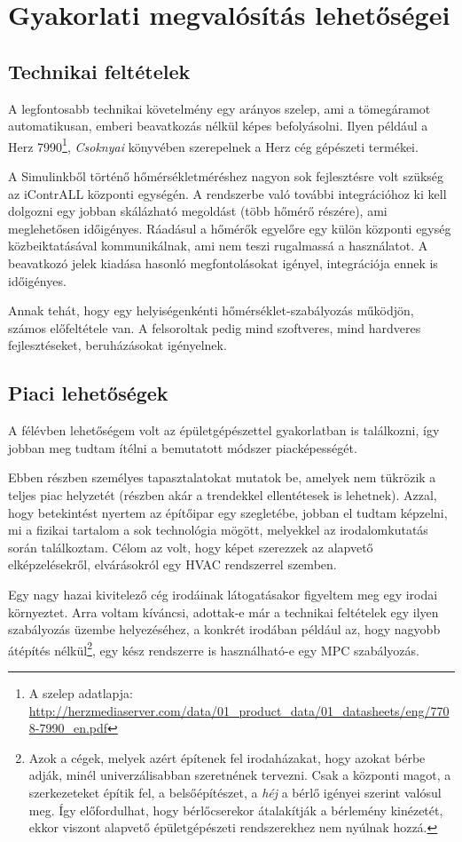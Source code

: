\chapter{Gyakorlati megvalósítás lehetőségei}


\section{Technikai feltételek}\label{chap:feasibility-tech}

A legfontosabb technikai követelmény egy arányos szelep, ami a tömegáramot automatikusan, emberi beavatkozás nélkül képes befolyásolni. Ilyen például a Herz 7990\footnote{A szelep adatlapja: \url{http://herzmediaserver.com/data/01_product_data/01_datasheets/eng/7708-7990_en.pdf}}, \textit{Csoknyai} \cite{Herz} könyvében szerepelnek a Herz cég gépészeti termékei.

A Simulinkből történő hőmérsékletméréshez nagyon sok fejlesztésre volt szükség az iContrALL központi egységén. A rendszerbe való további integrációhoz ki kell dolgozni egy jobban skálázható megoldást (több hőmérő részére), ami meglehetősen időigényes. Ráadásul a hőmérők egyelőre egy külön központi egység közbeiktatásával kommunikálnak, ami nem teszi rugalmassá a használatot.
A beavatkozó jelek kiadása hasonló megfontolásokat igényel, integrációja ennek is időigényes.

Annak tehát, hogy egy helyiségenkénti hőmérséklet-szabályozás működjön, számos előfeltétele van. A felsoroltak pedig mind szoftveres, mind hardveres fejlesztéseket, beruházásokat igényelnek.

\section{Piaci lehetőségek}

A félévben lehetőségem volt az épületgépészettel gyakorlatban is találkozni, így jobban meg tudtam ítélni a bemutatott módszer piacképességét.

Ebben részben személyes tapasztalatokat mutatok be, amelyek nem tükrözik a teljes piac helyzetét (részben akár a trendekkel ellentétesek is lehetnek). Azzal, hogy betekintést nyertem az építőipar egy szegletébe, jobban el tudtam képzelni, mi a fizikai tartalom a sok technológia mögött, melyekkel az irodalomkutatás során találkoztam. Célom az volt, hogy képet szerezzek az alapvető elképzelésekről, elvárásokról egy HVAC rendszerrel szemben.

Egy nagy hazai kivitelező cég irodáinak látogatásakor figyeltem meg egy irodai környeztet. Arra voltam kíváncsi, adottak-e már a technikai feltételek egy ilyen szabályozás üzembe helyezéséhez, a konkrét irodában például az, hogy nagyobb átépítés nélkül\footnote{Azok a cégek, melyek azért építenek fel irodaházakat, hogy azokat bérbe adják, minél univerzálisabban szeretnének tervezni. Csak a központi magot, a szerkezeteket építik fel, a belsőépítészet, a \textit{héj} a bérlő igényei szerint valósul meg. Így előfordulhat, hogy bérlőcserekor átalakítják a bérlemény kinézetét, ekkor viszont alapvető épületgépészeti rendszerekhez nem nyúlnak hozzá.}, egy kész rendszerre is használható-e egy MPC szabályozás.

